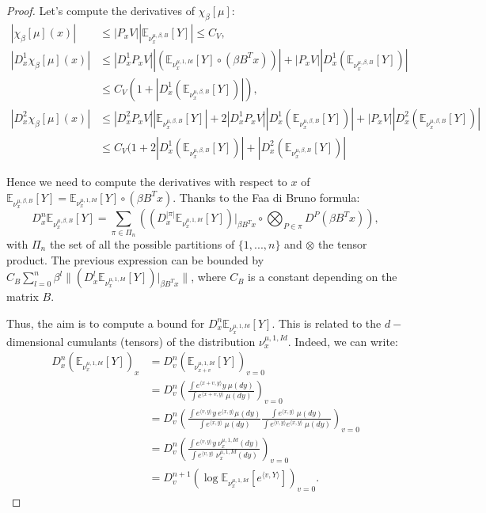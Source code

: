 \documentclass{article}
\numberwithin{theorem}{section}
\begin{document}
\begin{proof}
Let's compute the derivatives of $\chi_\beta[\mu]$:
\begin{align*}
    |\chi_\beta[\mu](x)| &\leq |P_xV| |\mathbb{E}_{\nu^{\mu, \beta, B}_x}[Y] |\leq C_V,\\
    |D^1_x \chi_\beta[\mu](x)| &\leq |D^1_x P_xV| |\left(\mathbb{E}_{\nu^{\mu, 1, Id}_x}[Y]\circ (\beta B^Tx)\right) | +|P_xV| |D^1_x \left(\mathbb{E}_{\nu^{\mu, \beta, B}_x}[Y] \right) |\\
    &\leq C_V\left(1+|D^1_x \left(\mathbb{E}_{\nu^{\mu, \beta, B}_x}[Y] \right)|\right),\\
    |D^2_x\chi_\beta[\mu](x)| &\leq |D^2_x P_xV||\mathbb{E}_{\nu^{\mu, \beta, B}_x}[Y] |+2|D^1_xP_xV||D^1_x \left(\mathbb{E}_{\nu^{\mu, \beta, B}_x}[Y] \right)|+|P_xV||D^2_x \left(\mathbb{E}_{\nu^{\mu, \beta, B}_x}[Y] \right)|\\
    &\leq C_V(1+2 |D^1_x \left(\mathbb{E}_{\nu^{\mu, \beta, B}_x}[Y] \right)|+|D^2_x \left(\mathbb{E}_{\nu^{\mu, \beta, B}_x}[Y] \right)|
\end{align*}

Hence we need to compute the derivatives with respect to $x$ of $\mathbb{E}_{\nu^{\mu, \beta, B}_x}[Y]=\mathbb{E}_{\nu^{\mu, 1, Id}_x}[Y]\circ(\beta B^Tx)$. Thanks to the Faa di Bruno formula:
$$
D^n_x \mathbb{E}_{\nu^{\mu, \beta, B}_x}[Y] = \sum_{\pi \in \Pi_n} \left((D^{|\pi|}_x \mathbb{E}_{\nu^{\mu, 1, Id}_x}[Y])|_{\beta B^Tx} \circ \bigotimes_{P\in \pi}D^{P} (\beta B^Tx)\right),
$$
with $\Pi_n$ the set of all the possible partitions of $\{1,...,n\}$ and $\otimes$ the tensor product. The previous expression 
can be bounded by $C_B\sum_{l=0}^n \beta^l \|(D^l_x\mathbb{E}_{\nu^{\mu, 1, Id}_x}[Y])|_{\beta B^Tx}\|$, where $C_B$ is a constant depending on the matrix $B$. 

Thus, the aim is to compute a bound for $D^{n}_x \mathbb{E}_{\nu^{\mu, 1, Id}_x}[Y]$. This is related to the $d-$ dimensional cumulants (tensors) of the distribution $\nu^{\mu, 1, Id}_x$. Indeed, we can write:
\begin{equation}
\label{eq:derivatives_cumulants}
\begin{aligned}
D^{n}_x \left(\mathbb{E}_{\nu^{\mu, 1, Id}_x}[Y] \right)_{x}& = D^{n}_v\left(\mathbb{E}_{\nu^{\mu, 1, Id}_{x+v}}[Y]\right)_{v=0}\\
&=D^{n}_v\left(\frac{\int e^{\langle x+v, y\rangle} y \ \mu(dy)}{\int e^{\langle x+v, y\rangle}\ \mu(dy)}\right)_{v=0}\\
&=D^{n}_v\left(\frac{\int e^{\langle v, y\rangle} y \ e^{\langle x, y\rangle}\mu(dy)}{\int e^{\langle x, y\rangle}\ \mu(dy)}\frac{\int e^{\langle x, y\rangle}\ \mu(dy)}{\int e^{\langle v, y\rangle} e^{\langle x, y\rangle}\ \mu(dy)}\right)_{v=0}\\
&=D^{n}_v\left(\frac{\int e^{\langle v, y\rangle} y \ \nu_{x}^{\mu,1,Id}(dy)}{ \int e^{\langle v, y\rangle} \ \nu_{x}^{\mu,1,Id}(dy)}\right)_{v=0}\\
&=D^{n+1}_v\left( \log \mathbb{E}_{\nu_{x}^{\mu,1,Id}}[e^{\langle v, Y\rangle}]\right)_{v=0}.
\end{aligned}
\end{equation}


\end{proof}
\end{document}
